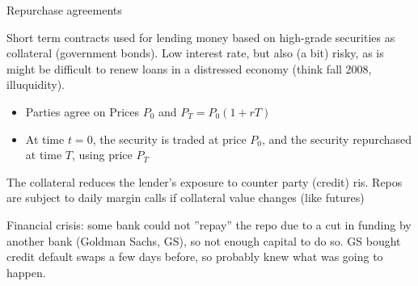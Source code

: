 \begin{description}
\item[Repurchase agreements] 
\end{description}

Short term contracts used for lending money based on high-grade securities as collateral (government
bonds). Low interest rate, but also (a bit) risky, as is might be difficult to renew loans in a
distressed economy (think fall 2008, illuquidity).

\begin{itemize}
\item Parties agree on Prices $P_0$ and $P_T = P_0 (1+rT)$
\item At time $t=0$, the security is traded at price $P_0$, and the security repurchased at time
  $T$, using price $P_T$
\end{itemize}
The collateral reduces the lender’s exposure to counter party (credit) ris.  Repos are subject to
daily margin calls if collateral value changes (like futures) 

Financial crisis: some bank could not ''repay'' the repo due to a cut in funding by another bank
(Goldman Sachs, GS), so not enough capital to do so. GS bought credit default swaps a few days
before, so probably knew what was going to happen.










